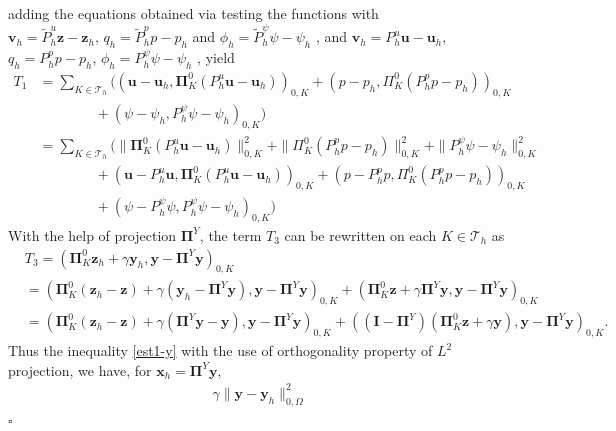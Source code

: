 \documentclass[smallextended]{svjour3}
\renewenvironment{proof}{\noindent{\it Proof.}}{\hfill$\square$}
\numberwithin{equation}{section}
\numberwithin{figure}{section}
\numberwithin{table}{section}
\newcommand\bI{\mathbf{I}}
\newcommand\bPi{\boldsymbol{\Pi}}
\newcommand{\tP}{\tilde{P}}
\newcommand\bx{\boldsymbol{x}}
\newcommand\by{\boldsymbol{y}}
\newcommand\bu{\boldsymbol{u}}
\newcommand\bv{\boldsymbol{v}}
\newcommand\bz{\boldsymbol{z}}
\newcommand\cT{\mathcal{T}}
\begin{document}
\begin{proof}
	adding the equations obtained via testing the functions with $\bv_h =\tP_h^u \bz - \bz_h, \,q_h =\tP_h^p p - p_h$ and $\phi_h=\tP_h^{\psi} \psi - \psi_h$
    , and $\bv_h =P_h^u \bu - \bu_h$, $q_h =P_h^p p - p_h$, $\phi_h =P_h^{\psi} \psi - \psi_h$ 
    , yield
		\begin{align*} 
			T_1 & = \sum_{K \in \cT_h} \Big( ( \bu - \bu_h, \bPi^{0}_K (P_h^u \bu - \bu_h) )_{0,K} +( p- p_h, \Pi^{0}_K (P_h^p p - p_h) )_{0,K} \\
			& \qquad \qquad + ( \psi- \psi_h, P_h^\psi \psi - \psi_h )_{0,K} \Big) \\
			& = \sum_{K \in \cT_h}  \Big( \| \bPi^{0}_K (P_h^u \bu - \bu_h)\|_{0,K}^2 + \| \Pi^{0}_K (P_h^p p - p_h)\|_{0,K}^2 + \| P_h^\psi \psi - \psi_h \|_{0,K}^2 \\
			& \qquad \qquad + ( \bu - P_h^u \bu, \bPi^{0}_K (P_h^u \bu - \bu_h) )_{0,K} +( p- P_h^p p, \Pi^{0}_K (P_h^p p - p_h) )_{0,K} \\
			& \qquad \qquad + ( \psi- P_h^\psi \psi, P_h^\psi \psi - \psi_h )_{0,K}  \Big)
		\end{align*}
    With the help of projection $\bPi^Y$, the term $T_3$ can be rewritten on each $K \in \cT_h$ as
\begin{align*}
	& %
    T_3= ( \bPi^{0}_K \bz_h + \gamma \by_h, \by - \bPi^Y \by )_{0, K}  \nonumber\\
	& = ( \bPi^{0}_K (\bz_h - \bz )+ \gamma (\by_h - \bPi^Y \by), \by - \bPi^Y \by )_{0, K}+  ( \bPi^{0}_K \bz+ \gamma \bPi^Y \by, \by - \bPi^Y \by )_{0, K} \nonumber\\
	& = ( \bPi^{0}_K (\bz_h - \bz)+ \gamma (\bPi^Y \by - \by), \by - \bPi^Y \by )_{0, K} +  ((\bI - \bPi^Y) ( \bPi^{0}_K \bz+ \gamma  \by), \by - \bPi^Y \by )_{0, K}. %
\end{align*}
    Thus the inequality \eqref{est1-y} with the use of orthogonality property of $L^2$ projection, we have, for $\bx_h = \bPi^Y \by $,
	\begin{align*}
		\gamma \| \by - \by_h \|_{0, \Omega}^2  

\end{align*}
\end{proof}
\end{document}
